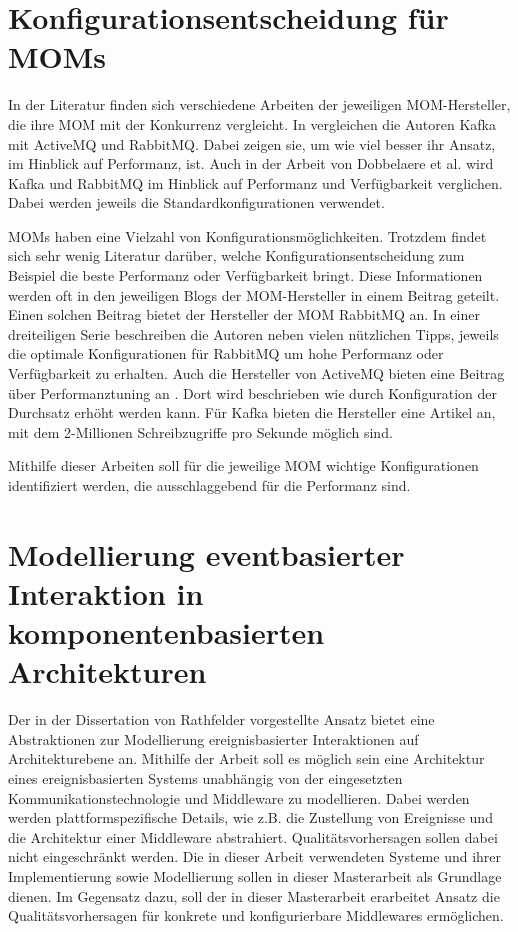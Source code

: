 \section{Konfigurationsentscheidung für MOMs}
\label{sec:config_mom}
In der Literatur finden sich verschiedene Arbeiten der jeweiligen MOM-Hersteller, die ihre MOM mit der Konkurrenz vergleicht. In \cite{kafka} vergleichen die Autoren Kafka mit ActiveMQ und RabbitMQ. Dabei zeigen sie, um wie viel besser ihr Ansatz, im Hinblick auf Performanz, ist. Auch in der Arbeit von Dobbelaere et al. \cite{Dobbelaere2017} wird Kafka und RabbitMQ im Hinblick auf Performanz und Verfügbarkeit verglichen. Dabei werden jeweils die Standardkonfigurationen verwendet. \par
MOMs haben eine Vielzahl von Konfigurationsmöglichkeiten. Trotzdem findet sich sehr wenig Literatur darüber, welche Konfigurationsentscheidung zum Beispiel die beste Performanz oder Verfügbarkeit bringt. Diese Informationen werden oft in den jeweiligen Blogs der MOM-Hersteller in einem Beitrag geteilt. Einen solchen Beitrag bietet der Hersteller der MOM RabbitMQ an. In einer dreiteiligen Serie \cite{rabbitconfig} beschreiben die Autoren neben vielen nützlichen Tipps, jeweils die optimale Konfigurationen für RabbitMQ um hohe Performanz oder Verfügbarkeit zu erhalten. Auch die Hersteller von ActiveMQ bieten eine Beitrag über Performanztuning an \cite{activemqconfig}. Dort wird beschrieben wie durch Konfiguration der Durchsatz erhöht werden kann. Für Kafka bieten die Hersteller eine Artikel \cite{kafkaconfig} an, mit dem 2-Millionen Schreibzugriffe pro Sekunde möglich sind. \par
Mithilfe dieser Arbeiten soll für die jeweilige MOM wichtige Konfigurationen identifiziert werden, die ausschlaggebend für die Performanz sind.

\section{Modellierung eventbasierter Interaktion in komponentenbasierten Architekturen}
Der in der Dissertation von Rathfelder \cite{Rathfelder2013} vorgestellte Ansatz bietet eine Abstraktionen zur Modellierung ereignisbasierter Interaktionen auf Architekturebene an. Mithilfe der Arbeit soll es möglich sein eine Architektur eines ereignisbasierten Systems unabhängig von der eingesetzten Kommunikationstechnologie und Middleware zu modellieren. Dabei werden werden plattformspezifische Details, wie z.B. die Zustellung von Ereignisse und die Architektur einer Middleware abstrahiert. Qualitätsvorhersagen sollen dabei nicht eingeschränkt werden. Die in dieser Arbeit verwendeten Systeme und ihrer Implementierung sowie Modellierung sollen in dieser Masterarbeit als Grundlage dienen. Im Gegensatz dazu, soll der in dieser Masterarbeit erarbeitet Ansatz die Qualitätsvorhersagen für konkrete und konfigurierbare Middlewares ermöglichen.
